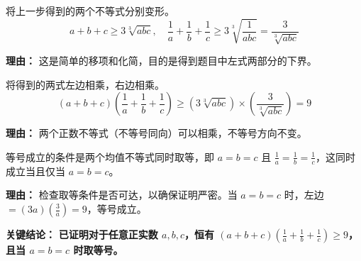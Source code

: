 \begin{examplebox}
\begin{description}[style=nextline, leftmargin=2.8em, labelsep=0.5em, itemsep=0.45em]
    \item[\textbf{第二步（改写不等式）：}] 将上一步得到的两个不等式分别变形。
    \[
    a+b+c \ge 3\sqrt[3]{abc}, \quad \frac{1}{a}+\frac{1}{b}+\frac{1}{c} \ge 3\sqrt[3]{\frac{1}{abc}} = \frac{3}{\sqrt[3]{abc}}
    \]
    \par\textbf{理由：} 这是简单的移项和化简，目的是得到题目中左式两部分的下界。

    \item[\textbf{第三步（两式相乘）：}] 将得到的两式左边相乘，右边相乘。
    \[
    (a+b+c)\left(\frac{1}{a}+\frac{1}{b}+\frac{1}{c}\right) \ge \left(3\sqrt[3]{abc}\right) \times \left(\frac{3}{\sqrt[3]{abc}}\right) = 9
    \]
    \par\textbf{理由：} 两个正数不等式（不等号同向）可以相乘，不等号方向不变。

    \item[\textbf{第四步（验证取等）：}] 等号成立的条件是两个均值不等式同时取等，即 $a=b=c$ 且 $\frac{1}{a}=\frac{1}{b}=\frac{1}{c}$，这同时成立当且仅当 $a=b=c$。
    \par\textbf{理由：} 检查取等条件是否可达，以确保证明严密。当 $a=b=c$ 时，左边 $= (3a)(\frac{3}{a})=9$，等号成立。
\end{description}

\textbf{\textcolor{CExample}{关键结论：}} \textbf{已证明对于任意正实数 $a,b,c$，恒有 $(a+b+c)(\frac{1}{a}+\frac{1}{b}+\frac{1}{c}) \ge 9$，且当 $a=b=c$ 时取等号。}
\end{examplebox}
